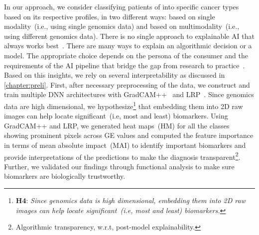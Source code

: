 \hspace*{3.5mm} In our approach, we consider classifying patients of into specific cancer types based on its respective profiles, in two different ways: based on single modality~(i.e., using single genomics data) and based on multimodality~(i.e., using different genomics data). There is no single approach to explainable AI that always works best~\cite{arya2019one}. There are many ways to explain an algorithmic decision or a model. The appropriate choice depends on the persona of the consumer and the requirements of the AI pipeline that bridge the gap from research to practice~\cite{arya2019one}. Based on this insights, we rely on several interpretability as discussed in \cref{chapter:preli}. First, after necessary preprocessing of the data, we construct and train multiple DNN architectures with GradCAM++~\cite{chattopadhay2018grad} and LRP~\cite{LRP1}. Since genomics data are high dimensional, we hypothesize\footnote{\textbf{H4}: \textit{Since genomics data is high dimensional, embedding them into 2D raw images can help locate significant~(i.e, most and least) biomarkers.}} that embedding them into 2D raw images can help locate significant~(i.e, most and least) biomarkers. 
Using GradCAM++ and LRP, we generated heat maps~(HM) for all the classes showing prominent pixels across GE values and computed the feature importance in terms of mean absolute impact~(MAI) to identify important biomarkers and provide interpretations of the predictions to make the diagnosis transparent\footnote{Algorithmic transparency, w.r.t, post-model explainability.}. Further, we validated our findings through functional analysis to make sure biomarkers are biologically trustworthy. %

